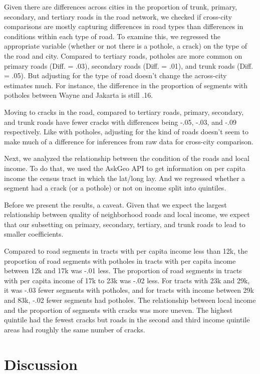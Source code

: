 \documentclass[12pt, letterpaper]{article}
\begin{document}
Given there are differences across cities in the proportion of trunk, primary, secondary, and tertiary roads in the road network, we checked if cross-city comparisons are mostly capturing differences in road types than differences in conditions within each type of road. To examine this, we regressed the appropriate variable (whether or not there is a pothole, a crack) on the type of the road and city. Compared to tertiary roads, potholes are more common on primary roads (Diff. = .03), secondary roads (Diff. = .01), and trunk roads (Diff. = .05). But adjusting for the type of road doesn't change the across-city estimates much. For instance, the difference in the proportion of segments with potholes between Wayne and Jakarta is still .16.

Moving to cracks in the road, compared to tertiary roads, primary, secondary, and trunk roads have fewer cracks with differences being -.05, -.03, and -.09 respectively. Like with potholes, adjusting for the kind of roads doesn't seem to make much of a difference for inferences from raw data for cross-city comparison. 

Next, we analyzed the relationship between the condition of the roads and local income. To do that, we used the AskGeo API to get information on per capita income the census tract in which the lat/long lay. And we regressed whether a segment had a crack (or a pothole) or not on income split into quintiles. 

Before we present the results, a caveat. Given that we expect the largest relationship between quality of neighborhood roads and local income, we expect that our subsetting on primary, secondary, tertiary, and trunk roads to lead to smaller coefficients. 

Compared to road segments in tracts with per capita income less than 12k, the proportion of road segments with potholes in tracts with per capita income between 12k and 17k  was -.01 less. The proportion of road segments in tracts with per capita income of 17k to 23k  was -.02 less. For tracts with 23k and 29k, it was -.03 fewer segments with potholes, and for tracts with income between 29k and 83k, -.02 fewer segments had potholes. The relationship between local income and the proportion of segments with cracks was more uneven. The highest quintile had the fewest cracks but roads in the second and third income quintile areas had roughly the same number of cracks.

\section*{Discussion}
\end{document}
